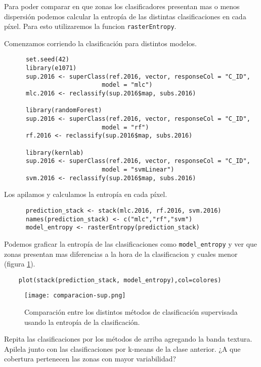 Para poder comparar en que zonas los clasificadores presentan mas o menos dispersi\'on podemos calcular la entrop\'ia de las distintas clasificaciones en cada p\'ixel. Para esto utilizaremos la funcion \texttt{rasterEntropy}.

\begin{exa}
  Comenzamos corriendo la clasificaci\'on para distintos modelos.

  \begin{lstlisting}
      set.seed(42)
      library(e1071)
      sup.2016 <- superClass(ref.2016, vector, responseCol = "C_ID",
                           model = "mlc")
      mlc.2016 <- reclassify(sup.2016$map, subs.2016)

      library(randomForest)
      sup.2016 <- superClass(ref.2016, vector, responseCol = "C_ID",
                           model = "rf")
      rf.2016 <- reclassify(sup.2016$map, subs.2016)

      library(kernlab)
      sup.2016 <- superClass(ref.2016, vector, responseCol = "C_ID",
                           model = "svmLinear")
      svm.2016 <- reclassify(sup.2016$map, subs.2016)
  \end{lstlisting}

  Los apilamos y calculamos la entrop\'ia en cada p\'ixel.

  \begin{lstlisting}
      prediction_stack <- stack(mlc.2016, rf.2016, svm.2016)
      names(prediction_stack) <- c("mlc","rf","svm")
      model_entropy <- rasterEntropy(prediction_stack)
  \end{lstlisting}

  Podemos graficar la entrop\'ia de las clasificaciones como \verb|model_entropy| y ver que zonas presentan mas diferencias a la hora de la clasificacion y cuales menor (figura \ref{fig:entropia}).

  \begin{lstlisting}
    plot(stack(prediction_stack, model_entropy),col=colores)
  \end{lstlisting}

  \begin{figure}[h!]
    \centering
    \texttt{[image: comparacion-sup.png]}
    \caption{Comparaci\'on entre los distintos m\'etodos de clasificaci\'on supervisada usando la entrop\'ia de la clasificaci\'on.}
    \label{fig:entropia}
  \end{figure}

\end{exa}

\begin{act}
  Repita las clasificaciones por los m\'etodos de arriba agregando la banda textura. Apilela junto con las clasificaciones por k-means de la clase anterior. ¿A que cobertura pertenecen las zonas con mayor variabilidad?
\end{act}
